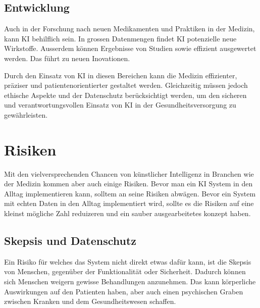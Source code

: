 \subsection{\normalsize{Entwicklung}}
Auch in der Forschung nach neuen Medikamenten und Praktiken in der Medizin, kann KI behilflich sein. In grossen Datenmengen findet KI potenzielle neue Wirkstoffe.
Ausserdem können Ergebnisse von Studien sowie effizient ausgewertet werden. Das führt zu neuen Inovationen.

\vspace{3mm} \noindent
Durch den Einsatz von KI in diesen Bereichen kann die Medizin effizienter, präziser und patientenorientierter gestaltet werden. 
Gleichzeitig müssen jedoch ethische Aspekte und der Datenschutz berücksichtigt werden, um den sicheren und verantwortungsvollen Einsatz von KI in der Gesundheitsversorgung zu gewährleisten.

\vspace{2cm}
\section{Risiken}
Mit den vielversprechenden Chancen von künstlicher Intelligenz in Branchen wie der Medizin kommen aber auch einige Risiken. Bevor man ein KI System in den Alltag implementieren kann, solltem an seine Risiken abwägen.
Bevor ein System mit echten Daten in den Alltag implementiert wird, sollte es die Risiken auf eine kleinst mögliche Zahl reduizeren und ein sauber ausgearbeitetes konzept haben.


\subsection{\normalsize{Skepsis und Datenschutz}}
Ein Risiko für welches das System nicht direkt etwas dafür kann, ist die Skepsis von Menschen, gegenüber der Funktionalität oder Sicherheit. 
Dadurch können sich Menschen weigern gewisse Behandlungen anzunehmen. Das kann körperliche Auswirkungen auf den Patienten haben, aber auch einen psychischen Graben zwischen Kranken und dem Gesundheitswesen schaffen.

